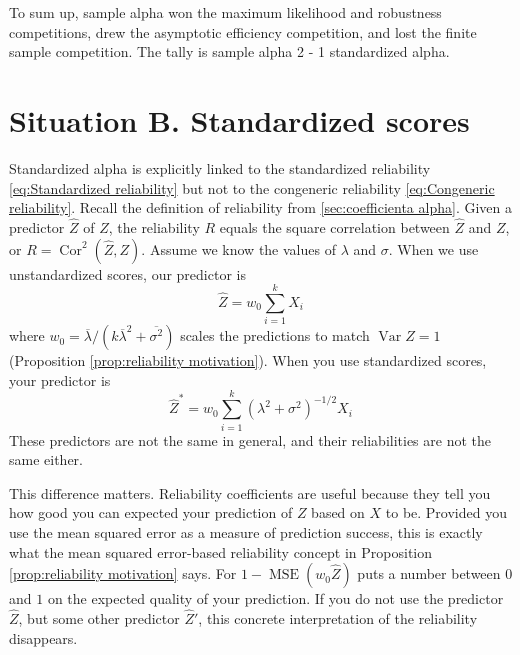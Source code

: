 \documentclass[twoside]{article}
\DeclareMathOperator{\Var}{Var}
\DeclareMathOperator{\Cor}{Cor}
\DeclareMathOperator{\MSE}{MSE}
\begin{document}
To sum up, sample alpha won the maximum likelihood and robustness competitions, drew the asymptotic efficiency competition, and lost the finite sample competition. The tally is sample alpha 2 - 1 standardized alpha. 



\section{Situation B. Standardized scores}
\label{sec:argument B}

Standardized alpha is explicitly linked to the standardized reliability \eqref{eq:Standardized reliability} but not to the congeneric reliability \eqref{eq:Congeneric reliability}. Recall the definition of reliability from
\cref{sec:coefficienta alpha}. Given a predictor $\hat{Z}$ of $Z$, the
reliability $ R$ equals the square correlation between $\hat{Z}$
and $Z$, or $ R=\Cor^{2}(\hat{Z},Z)$. Assume
we know the values of $\lambda$ and $\sigma$. When we use unstandardized
scores, our predictor is 
\begin{equation}
\hat{Z}=w_{0}\sum_{i=1}^{k}X_{i}\label{eq:sum score}
\end{equation}
where $w_{0}=\overline{\lambda}/(k\overline{\lambda}^{2}+\overline{\sigma^{2}})$ scales the predictions to match $\Var Z=1$ (Proposition \ref{prop:reliability motivation}). When you use standardized
scores, your predictor is
\begin{equation}
\hat{Z}^{*}=w_{0}\sum_{i=1}^{k}(\lambda^{2}+\sigma^{2})^{-1/2}X_{i}\label{eq:standardized sum score}
\end{equation}
These predictors are not the same in general, and their reliabilities are not
the same either.

This difference matters. Reliability coefficients are useful because they tell you how good you can expected your prediction of $Z$ based on $X$ to be. Provided you use the mean squared error as a measure of prediction success, this is exactly what the mean squared error-based reliability concept in Proposition \ref{prop:reliability motivation} says. For $1 - \MSE(w_0\hat{Z})$ puts a number between $0$ and $1$ on the expected quality of your prediction. If you do not use the predictor $\hat{Z}$, but some other predictor $\hat{Z}'$, this concrete interpretation of the reliability disappears. 
\end{document}
